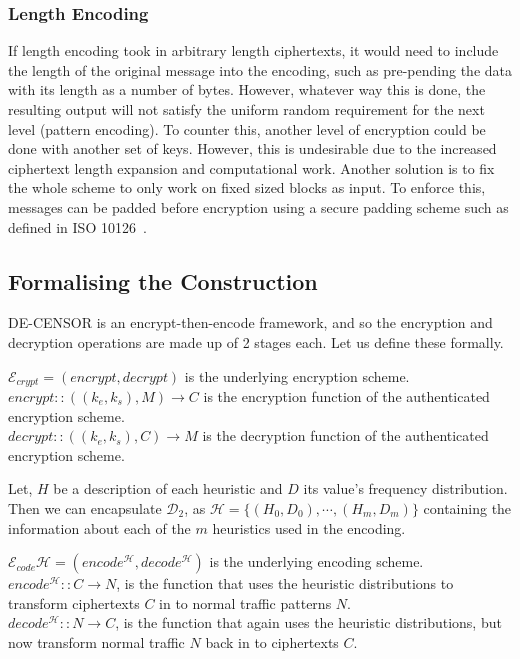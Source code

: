 \documentclass[ %
                    author={Samuel Russell},
                supervisor={Prof. Bogdan Warinschi},
                    degree={MEng},
                     title={Innocuous Ciphertexts},
                  subtitle={The DE-CENSOR Scheme},
                      type={research},
                      year={2018} ]{dissertation}
\begin{document}
\subsubsection{Length Encoding}

If length encoding took in arbitrary length ciphertexts, it would need to include the length of the original message into the encoding, such as pre-pending the data with its length as a number of bytes.
However, whatever way this is done, the resulting output will not satisfy the uniform random requirement for the next level (pattern encoding).
To counter this, another level of encryption could be done with another set of keys. However, this is undesirable due to the increased ciphertext length expansion and computational work.
Another solution is to fix the whole scheme to only work on fixed sized blocks as input. To enforce this, messages can be padded before encryption using a secure padding scheme such as defined in ISO 10126~\cite{iso-pad}.


\subsection{Formalising the Construction}

DE-CENSOR is an encrypt-then-encode framework, and so the encryption and decryption operations are made up of 2 stages each. Let us define these formally.

$\mathcal{E}_{crypt} = (encrypt, decrypt) $ is the underlying encryption scheme.\\
$encrypt :: ( (k_e, k_s), M ) \rightarrow C$ is the encryption function of the authenticated encryption scheme.\\
$decrypt :: ( (k_e, k_s), C ) \rightarrow M$ is the decryption function of the authenticated encryption scheme.

Let, $H$ be a description of each heuristic and $D$ its value's frequency distribution.
Then we can encapsulate $\mathcal{D}_2$, as $\mathcal{H} = \{(H_0,D_0), \cdots , (H_m,D_m)\}$ containing the information about each of the $m$ heuristics used in the encoding.

$\mathcal{E}_{code}{\mathcal{H}} = (encode^{\mathcal{H}}, decode^{\mathcal{H}}) $ is the underlying encoding scheme.\\
$encode^{\mathcal{H}} :: C \rightarrow N$, is the function that uses the heuristic distributions to transform ciphertexts $C$ in to normal traffic patterns $N$.\\
$decode^{\mathcal{H}} :: N \rightarrow C$, is the function that again uses the heuristic distributions, but now transform normal traffic $N$ back in to ciphertexts $C$.
\end{document}
